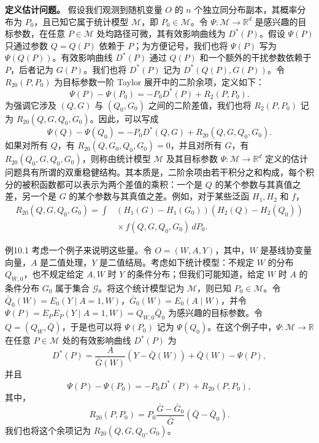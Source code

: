 \noindent\textbf{定义估计问题。}
假设我们观测到随机变量 $O$ 的 $n$ 个独立同分布副本，其概率分布为 $P_0$，且已知它属于统计模型 $\mathcal M$，即 $P_0\in\mathcal M$。令 $\Psi:\mathcal M\to\mathbb R^d$ 是感兴趣的目标参数，在任意 $P\in\mathcal M$ 处均路径可微，其有效影响曲线为 $D^*(P)$。假设 $\Psi(P)$ 只通过参数 $Q=Q(P)$ 依赖于 $P$；为方便记号，我们也将 $\Psi(P)$ 写为 $\Psi(Q(P))$。有效影响曲线 $D^*(P)$ 通过 $Q(P)$ 和一个额外的干扰参数依赖于 $P$，后者记为 $G(P)$。我们也将 $D^*(P)$ 记为 $D^*(Q(P),G(P))$。令 $R_{20}(P,P_0)$ 为目标参数一阶 Taylor 展开中的二阶余项，定义如下：
\[
 \Psi(P)-\Psi(P_0)=-P_0D^*(P)+R_2(P,P_0).
\]
为强调它涉及 $(Q,G)$ 与 $(Q_0,G_0)$ 之间的二阶差值，我们也将 $R_2(P,P_0)$ 记为 $R_{20}(Q,G,Q_0,G_0)$。因此，可以写成
\[
 \Psi(Q)-\Psi(Q_0)
 =-P_0D^*(Q,G)+R_{20}(Q,G,Q_0,G_0).
\]
如果对所有 $Q$，有 $R_{20}(Q,G_0,Q_0,G_0)=0$，并且对所有 $G$，有 $R_{20}(Q_0,G,Q_0,G_0)$，则称由统计模型 $\mathcal M$ 及其目标参数 $\Psi:\mathcal M\to\mathbb R^d$ 定义的估计问题具有所谓的双重稳健结构。其本质是，二阶余项由若干积分之和构成，每个积分的被积函数都可以表示为两个差值的乘积：一个是 $Q$ 的某个参数与其真值之差，另一个是 $G$ 的某个参数与其真值之差。例如，对于某些泛函 $H_1,H_2$ 和 $f$，
\[
 \begin{aligned}
 R_{20}(Q,G,Q_0,G_0)
 =\int &(H_1(G)-H_1(G_0))(H_2(Q)-H_2(Q_0))\\
 &{}\times f(Q,G,Q_0,G_0)\,dP_0.
 \end{aligned}
\]

\begin{bookresult}{例}{10.1}
考虑一个例子来说明这些量。令 $O=(W,A,Y)$，其中，$W$ 是基线协变量向量，$A$ 是二值处理，$Y$ 是二值结局。考虑如下统计模型：不规定 $W$ 的分布 $Q_{W,0}$，也不规定给定 $A,W$ 时 $Y$ 的条件分布；但我们可能知道，给定 $W$ 时 $A$ 的条件分布 $G_0$ 属于集合 $\mathcal G$。将这个统计模型记为 $\mathcal M$，则已知 $P_0\in\mathcal M$。令 $\bar Q_0(W)=E_0(Y\mid A=1,W)$，$\bar G_0(W)=E_0(A\mid W)$，并令
$\Psi(P)=E_PE_P(Y\mid A=1,W)=Q_{W,0}\bar Q_0$
为感兴趣的目标参数。令 $Q=(Q_W,\bar Q)$，于是也可以将 $\Psi(P_0)$ 记为 $\Psi(Q_0)$。在这个例子中，$\Psi:\mathcal M\to\mathbb R$ 在任意 $P\in\mathcal M$ 处的有效影响曲线 $D^*(P)$ 为
\[
 D^*(P)=\frac{A}{\bar G(W)}(Y-\bar Q(W))+\bar Q(W)-\Psi(P),
\]
并且
\[
 \Psi(P)-\Psi(P_0)=-P_0D^*(P)+R_{20}(P,P_0),
\]
其中，
\[
 R_{20}(P,P_0)
 =P_0\frac{\bar G-\bar G_0}{\bar G}(\bar Q-\bar Q_0).
\]
我们也将这个余项记为 $R_{20}(Q,G,Q_0,G_0)$。
\end{bookresult}

